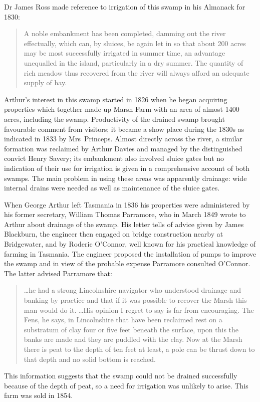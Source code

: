 Dr James Ross  made reference to irrigation of this
swamp in his Almanack for 1830:
\begin{quote}
	A noble embankment has been completed, damming out the river
        effectually, which can, by sluices, be again let in so that
        about 200 acres may be most successfully irrigated in summer
        time, an advantage unequalled in the island, particularly in a
        dry summer. The quantity of rich meadow thus recovered from
        the river will always afford an adequate supply of
        hay.
\end{quote}

Arthur's interest in this swamp started in 1826 when he began
acquiring properties which together made up Marsh Farm with an area of
almost 1400\,acres, including the swamp.  Productivity of the drained
swamp brought favourable comment from visitors; it became a show place
during the 1830s as indicated in 1833 by Mrs~Princeps.  Almost
directly across the river, a similar formation was reclaimed by Arthur
Davies and managed by the distinguished convict
Henry Savery; its embankment also involved sluice
gates but no indication of their use for irrigation is given in a
comprehensive account of both swamps.  The main problem in using these
areas was apparently drainage: wide internal drains were needed as
well as maintenance of the sluice gates.

When George Arthur left Tasmania in 1836 his properties were
administered by his former secretary, William Thomas
Parramore, who in March 1849 wrote to Arthur
about drainage of the swamp.  His letter tells of advice given by
James Blackburn, the engineer then engaged on
bridge construction nearby at Bridgewater, and by Roderic
O'Connor,  well known for his practical knowledge
of farming in Tasmania.  The engineer proposed the installation of
pumps to improve the swamp and in view of the probable expense
Parramore consulted O'Connor.  The latter advised Parramore that:
\begin{quote}
	\ldots he had a strong Lincolnshire navigator who understood
	drain\-age and banking by practice and that if it was possible
	to recover the Marsh this man would do it. \ldots His opinion
	I regret to say is far from encouraging.  The Fens, he says,
	in Lincolnshire that have been reclaimed rest on a substratum
	of clay four or five feet beneath the surface, upon this the
	banks are made and they are puddled with the clay.  Now at the
	Marsh there is peat to the depth of ten feet at least, a pole
	can be thrust down to that depth and no solid bottom is
	reached.
\end{quote}
This information suggests that the swamp could not be drained
successfully because of the depth of peat, so a need for irrigation
was unlikely to arise.  This farm was sold in 1854.

